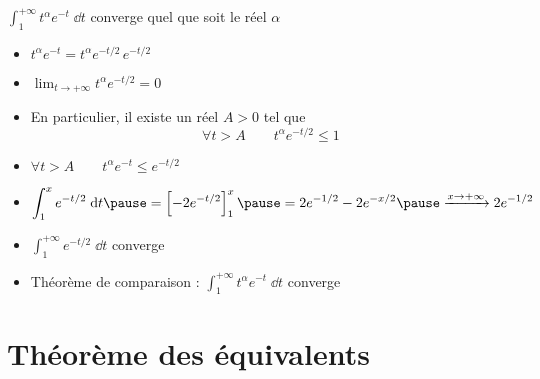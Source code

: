 \begin{frame}
\begin{exemple}

$\int_1^{+\infty} t^\alpha e^{-t}\;\dd t$ converge quel que soit le réel $\alpha$ 


\begin{itemize}
  \item \pause $t^\alpha e^{-t} = t^\alpha e^{-t/2}\,e^{-t/2}$
  \item \pause $\lim_{t\rightarrow+\infty} t^\alpha e^{-t/2} =0$
  \item \pause En particulier, il existe un réel $A>0$ tel que 
$$\forall t>A\qquad t^\alpha e^{-t/2}\le 1$$  
  \item \pause $\forall t>A\qquad t^\alpha e^{-t}\le e^{-t/2}$ 
  \item \pause $\displaystyle 
\int_1^x e^{-t/2}\;\dd t 
\pause = \left[-2 e^{-t/2}\right]_1^x 
\pause = 2e^{-1/2} -2e^{-x/2}
\pause \xrightarrow{x\rightarrow+\infty}2e^{-1/2}$ 
  \item \pause $\int_1^{+\infty} e^{-t/2}\;\dd t$ converge
  \item \pause Théorème de comparaison : $\int_1^{+\infty} t^\alpha e^{-t}\;\dd t$ converge
\end{itemize}
\end{exemple}
\end{frame}


\section*{Théorème des équivalents}

